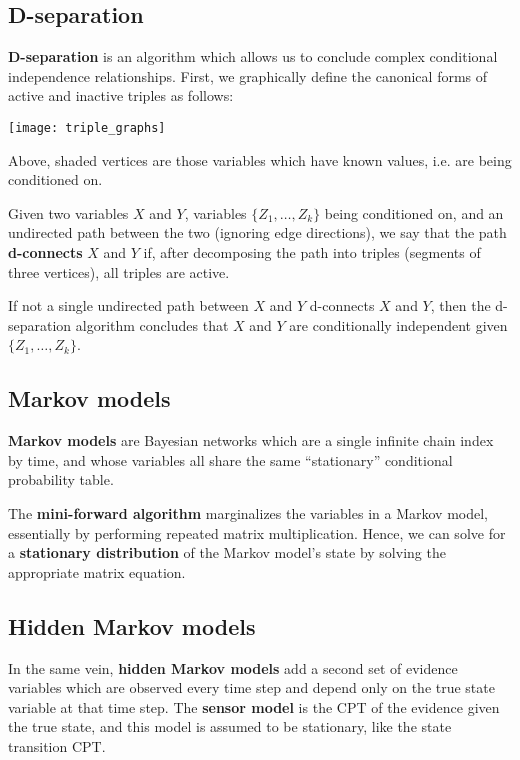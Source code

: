 \documentclass[12pt]{article}
\begin{document}
\subsection{D-separation}

\textbf{D-separation} is an algorithm which allows us to conclude complex conditional independence relationships. First, we graphically define the canonical forms of active and inactive triples as follows:
\begin{center}
\texttt{[image: triple\_graphs]}
\end{center}
Above, shaded vertices are those variables which have known values, i.e. are being conditioned on.

Given two variables $X$ and $Y$, variables $\{Z_1, \ldots, Z_k\}$ being conditioned on, and an undirected path between the two (ignoring edge directions), we say that the path \textbf{d-connects} $X$ and $Y$ if, after decomposing the path into triples (segments of three vertices), all triples are active.

If not a single undirected path between $X$ and $Y$ d-connects $X$ and $Y$, then the d-separation algorithm concludes that $X$ and $Y$ are conditionally independent given $\{Z_1, \ldots, Z_k\}$.

\subsection{Markov models}

\textbf{Markov models} are Bayesian networks which are a single infinite chain index by time, and whose variables all share the same ``stationary'' conditional probability table.

The \textbf{mini-forward algorithm} marginalizes the variables in a Markov model, essentially by performing repeated matrix multiplication. Hence, we can solve for a \textbf{stationary distribution} of the Markov model's state by solving the appropriate matrix equation.

\subsection{Hidden Markov models}

In the same vein, \textbf{hidden Markov models} add a second set of evidence variables which are observed every time step and depend only on the true state variable at that time step. The \textbf{sensor model} is the CPT of the evidence given the true state, and this model is assumed to be stationary, like the state transition CPT.
\end{document}
